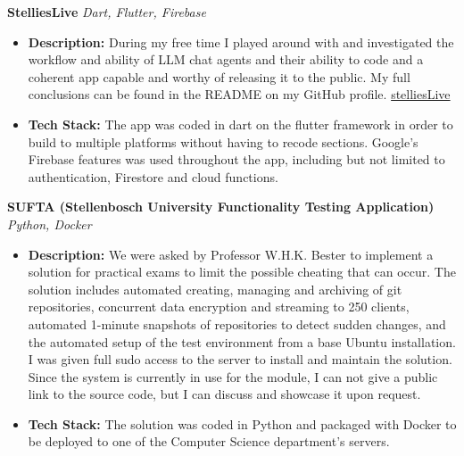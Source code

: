 \documentclass[11pt,a4paper]{article}
\begin{document}
\noindent\textbf{StelliesLive} \hfill \textit{Dart, Flutter, Firebase}

	\vspace{5pt}


\begin{itemize}
	\item \textbf{Description:} During my free time I played around with and investigated the workflow
		and ability of LLM chat agents and their ability to code and a coherent
		app capable and worthy of releasing it to the public. My full
		conclusions can be found in the README on my GitHub profile. 
		\href{https://github.com/Carlo-J-Smit/stelliesLive}{stelliesLive}

	\vspace{2pt}

	\item \textbf{Tech Stack:} The app was coded in dart on the flutter
		framework in order to build to multiple platforms without having to
		recode sections. Google's Firebase features was used throughout the app,
		including but not limited to authentication, Firestore and cloud
		functions.

\end{itemize}
	\vspace{10pt}

\noindent\textbf{SUFTA (Stellenbosch University Functionality Testing Application)}
\hfill \textit{Python, Docker}

	\vspace{5pt}

\begin{itemize}
	\item \textbf{Description:} We were asked by Professor W.H.K. Bester to
		implement a solution for practical exams to limit the possible cheating
		that can occur. The solution includes automated creating, managing and
		archiving of git
		repositories, concurrent data encryption and streaming to 250 clients,
		automated 1-minute snapshots of repositories to detect sudden changes,
		and the automated setup of the test environment from a base Ubuntu
		installation. I was given full sudo access to the server to install and
		maintain the solution. Since the system is currently in use for the module, I
		can not give a public link to the source code, but I can discuss and showcase it upon
		request.

	\vspace{2pt}

	\item \textbf{Tech Stack:} The solution was coded in Python and packaged
		with Docker to be deployed to one of the Computer Science department's
		servers.

\end{itemize}
\end{document}
